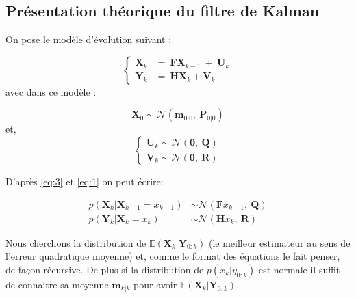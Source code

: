 \subsection{Présentation théorique du filtre de Kalman}

On pose le modèle d'évolution suivant :

\begin{equation}
	\begin{cases}
		\mathbf{X}_{k} & =\ \mathbf{FX}_{k-1} \ +\ \mathbf{U}_{k}\\
		\mathbf{Y}_{k} & =\ \mathbf{HX}_{k} +\mathbf{V}_{k}
	\end{cases}
\label{eq:1}
\end{equation}	avec dans ce modèle :


\begin{equation}
	\mathbf{X}_{0} \sim \mathcal{N}(\mathbf{m}_{0|0} ,\ \mathbf{P}_{0|0})
\end{equation}
et,
\begin{equation}
	\begin{cases}
		\mathbf{U}_{k} \sim \mathcal{N}(\mathbf{0} ,\ \mathbf{Q})\\
		\mathbf{V}_{k} \sim \mathcal{N}(\mathbf{0} ,\ \mathbf{R})
	\end{cases}
\label{eq:3}
\end{equation}


D'après \ref{eq:3} et \ref{eq:1} on peut écrire:

\begin{equation}
	\begin{aligned}
		p(\mathbf{X}_{k} |\mathbf{X}_{k-1} =x_{k-1}) & \sim \mathcal{N}(\mathbf{F} x_{k-1} ,\ \mathbf{Q})\\
		p(\mathbf{Y}_{k} |\mathbf{X}_{k} =x_{k}) & \sim \mathcal{N}(\mathbf{H} x_{k} ,\ \mathbf{R})
	\end{aligned}
\label{eq:density}
\end{equation}




Nous cherchons la distribution de $\mathbb{E}(\mathbf{X}_{k} |\mathbf{Y}_{0:k})$ (le meilleur estimateur au sens de l'erreur quadratique moyenne) et, comme le format des équations le fait penser, de façon récursive. \newline 
De plus si la distribution de $p( x_{k} |y_{0:k})$ est normale il suffit de connaitre sa moyenne $\mathbf{m}_{k|k}$ pour avoir $\mathbb{E}(\mathbf{X}_{k} |\mathbf{Y}_{0:k})$.

